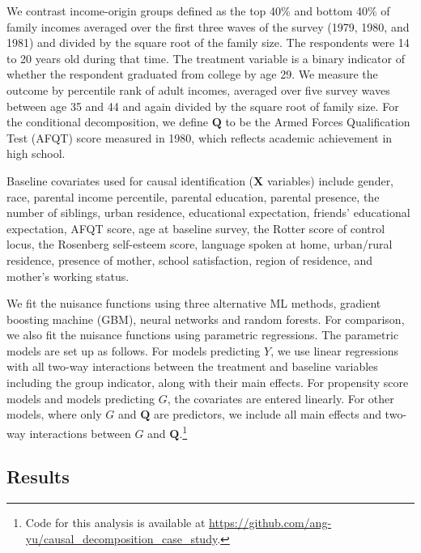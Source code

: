 \documentclass[12pt,a4paper]{article}
\def\X{{\boldsymbol X}}
\def\Q{{\boldsymbol Q}}
\begin{document}
We contrast income-origin groups defined as the top 40\% and bottom 40\% of family incomes averaged over the first three waves of the survey (1979, 1980, and 1981) and divided by the square root of the family size. The respondents were 14 to 20 years old during that time. The treatment variable is a binary indicator of whether the respondent graduated from college by age 29. We measure the outcome by percentile rank of adult incomes, averaged over five survey waves between age 35 and 44 and again divided by the square root of family size. For the conditional decomposition, we define $\Q$ to be the Armed Forces Qualification Test (AFQT) score measured in 1980, which reflects academic achievement in high school. 

Baseline covariates used for causal identification ($\X$ variables) include gender, race, parental income percentile, parental education, parental presence, the number of siblings, urban residence, educational expectation, friends' educational expectation, AFQT score, age at baseline survey, the Rotter score of control locus, the Rosenberg self-esteem score, language spoken at home, urban/rural residence, presence of mother, school satisfaction, region of residence, and mother's working status. 

We fit the nuisance functions using three alternative ML methods, gradient boosting machine (GBM), neural networks and random forests. For comparison, we also fit the nuisance functions using parametric regressions. The parametric models are set up as follows. For models predicting $Y$, we use linear regressions with all two-way interactions between the treatment and  baseline variables including the group indicator, along with their main effects. For propensity score models and models predicting $G$, the covariates are entered linearly. For other models, where only $G$ and $\Q$ are predictors, we include all main effects and two-way interactions between $G$ and $\Q$.\footnote{Code for this analysis is available at \url{https://github.com/ang-yu/causal_decomposition_case_study}.}

\subsection{Results}
\end{document}
